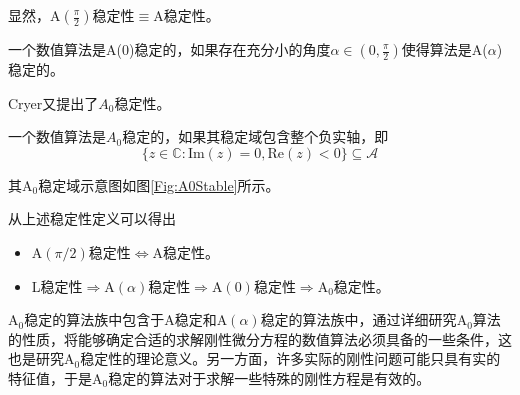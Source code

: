 显然，A$(\frac{\pi}{2})$稳定性$\equiv$A稳定性。
\begin{definition}[A($0$)稳定性]
一个数值算法是A($0$)稳定的\cite{YuanZhaoDing1987a,Fatunla1988a}，如果存在充分小的角度$\alpha\in(0,\frac{\pi}{2})$使得算法是A($\alpha$)稳定的。
\end{definition}

Cryer又提出了$A_0$稳定性\cite{Cryer1973a}。
\begin{definition}[$A_0$稳定性]
一个数值算法是$A_0$稳定的\cite{YuanZhaoDing1987a,Cryer1973a,Fatunla1988a}，如果其稳定域包含整个负实轴，即
\begin{equation}
\{z\in\mathbb{C}:\text{Im}(z)=0,\text{Re}(z)<0\}\subseteq\mathcal{A}
\end{equation}
\end{definition}
其$\text{A}_0$稳定域示意图如图\ref{Fig:A0Stable}所示。
\begin{figure}[htpb]
\centering
{}
\end{figure}

从上述稳定性定义可以得出
\begin{itemize}
\item[\ddag] A$(\pi/2)$稳定性$\iff$A稳定性。
\item[\ddag] L稳定性$\Longrightarrow$A$(\alpha)$稳定性$\Longrightarrow$A$(0)$稳定性$\Longrightarrow$$\text{A}_0$稳定性。
\end{itemize}

$\text{A}_0$稳定的算法族中包含于A稳定和A$(\alpha)$稳定的算法族中，通过详细研究$\text{A}_0$算法的性质，将能够确定合适的求解刚性微分方程的数值算法必须具备的一些条件，这也是研究$\text{A}_0$稳定性的理论意义。另一方面，许多实际的刚性问题可能只具有实的特征值，于是$\text{A}_0$稳定的算法对于求解一些特殊的刚性方程是有效的。

